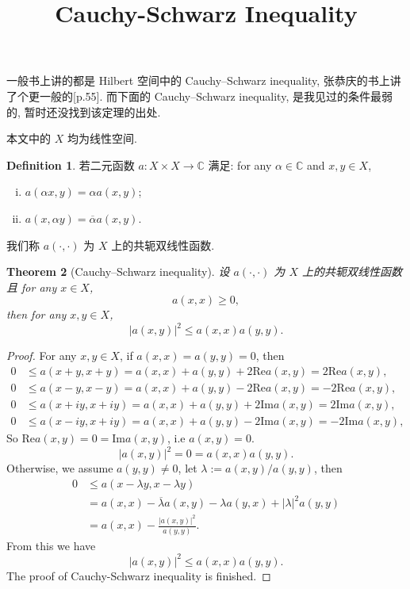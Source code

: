 \documentclass[a4paper,12pt]{article}
\title{Cauchy-Schwarz Inequality}
\newtheorem{theorem}{Theorem}[section]
\theoremstyle{definition}
\newtheorem{definition}[theorem]{Definition}
\begin{document}
\begin{CJK*}{UTF8}{gbsn}

\maketitle

一般书上讲的都是 Hilbert 空间中的 Cauchy–Schwarz inequality, 张恭庆的书上讲了个更一般的[p.55]. 
而下面的 Cauchy–Schwarz inequality, 是我见过的条件最弱的, 暂时还没找到该定理的出处.

本文中的 $ X $ 均为线性空间.

\begin{definition}
    若二元函数 $ a: X \times X \to \mathbb{C} $ 满足: 
    for any $ \alpha \in \mathbb{C} $ and $ x, y \in X $,
    \begin{enumerate}[(i)]
        \item $ a(\alpha x, y) = \alpha a(x, y) $;
        \item $ a(x, \alpha y) = \overline{\alpha} a(x, y) $.
    \end{enumerate}
    我们称 $ a(\cdot, \cdot) $ 为 $ X $ 上的共轭双线性函数.
\end{definition}

\begin{theorem}[Cauchy–Schwarz inequality]
    设 $ a(\cdot, \cdot) $ 为 $ X $ 上的共轭双线性函数且 for any $ x \in X $,
    $$ 
        a(x, x) \geq 0,
    $$
    then for any $  x, y \in X $,
    \begin{equation} \label{result}
        |a(x, y)|^2 \leq a(x, x) a(y, y).
    \end{equation}
\end{theorem}

\begin{proof}
    For any $  x, y \in X $, if $ a(x, x) = a(y, y) = 0 $, then
    \begin{align*}
        0 &\leq a(x + y, x + y) = a(x, x) + a(y, y) + 2 \text{Re} a(x, y) = 2 \text{Re} a(x, y), \\
        0 &\leq a(x - y, x - y) = a(x, x) + a(y, y) - 2 \text{Re} a(x, y) = - 2 \text{Re} a(x, y), \\
        0 &\leq a(x + iy, x + iy) = a(x, x) + a(y, y) + 2 \text{Im} a(x, y) = 2 \text{Im} a(x, y), \\
        0 &\leq a(x - iy, x + iy) = a(x, x) + a(y, y) - 2 \text{Im} a(x, y) = - 2 \text{Im} a(x, y),
    \end{align*}
    So $ \text{Re} a(x, y) = 0 = \text{Im} a(x, y) $, i.e $ a(x, y) = 0 $. 
    $$ 
        |a(x, y)|^2 = 0 = a(x, x) a(y, y).
    $$
    Otherwise, we assume $ a(y, y) \neq 0 $, let $ \lambda := a(x, y) / a(y, y) $, then
    \begin{align*}
        0 &\leq a(x - \lambda y, x - \lambda y)\\
          &= a(x, x) - \overline{\lambda} a(x, y) - \lambda a(y, x) + |\lambda|^2 a(y, y) \\
          &= a(x, x) - \frac{|a(x, y)|^2}{a(y, y)}.
    \end{align*}
    From this we have
    $$ 
        |a(x, y)|^2 \leq a(x, x) a(y, y).
    $$
    The proof of Cauchy-Schwarz inequality is finished.
\end{proof}

\end{CJK*}
\end{document}
